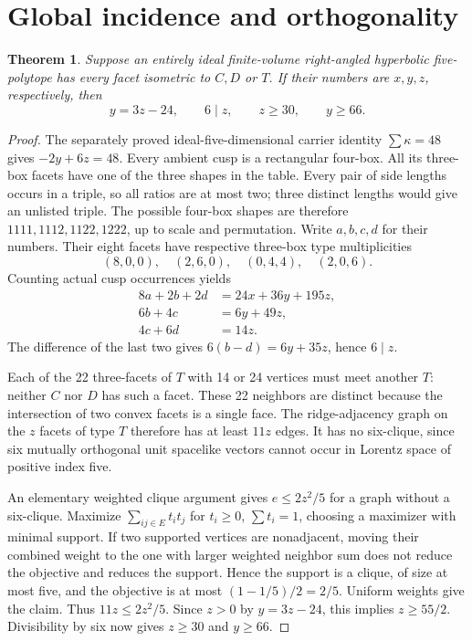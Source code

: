 \documentclass[11pt]{article}
\newtheorem{theorem}{Theorem}
\begin{document}
\section{Global incidence and orthogonality}
\begin{theorem}
Suppose an entirely ideal finite-volume right-angled hyperbolic
five-polytope has every facet isometric to $C,D$ or $T$. If their
numbers are $x,y,z$, respectively, then
\[
 y=3z-24,\qquad 6\mid z,\qquad z\ge30,\qquad y\ge66.
\]
\end{theorem}
\begin{proof}
The separately proved ideal-five-dimensional carrier identity
$\sum\kappa=48$ gives $-2y+6z=48$.
Every ambient cusp is a rectangular four-box. All its three-box facets
have one of the three shapes in the table. Every pair of side lengths
occurs in a triple, so all ratios are at most two; three distinct lengths
would give an unlisted triple. The possible four-box shapes are therefore
$1111,1112,1122,1222$, up to scale and permutation.
Write $a,b,c,d$ for their numbers. Their eight facets have respective
three-box type multiplicities
\[
 (8,0,0),\quad(2,6,0),\quad(0,4,4),\quad(2,0,6).
\]
Counting actual cusp occurrences yields
\begin{align*}
8a+2b+2d&=24x+36y+195z,\\
6b+4c&=6y+49z,\\
4c+6d&=14z.
\end{align*}
The difference of the last two gives $6(b-d)=6y+35z$, hence $6\mid z$.

Each of the 22 three-facets of $T$ with 14 or 24 vertices must meet
another $T$: neither $C$ nor $D$ has such a facet. These 22 neighbors
are distinct because the intersection of two convex facets is a single
face. The ridge-adjacency graph on the $z$ facets of type $T$ therefore
has at least $11z$ edges. It has no six-clique, since six mutually
orthogonal unit spacelike vectors cannot occur in Lorentz space of
positive index five.

An elementary weighted clique argument gives $e\le2z^2/5$ for a graph
without a six-clique. Maximize $\sum_{ij\in E}t_it_j$ for $t_i\ge0$,
$\sum t_i=1$, choosing a maximizer with minimal support. If two supported
vertices are nonadjacent, moving their combined weight to the one with
larger weighted neighbor sum does not reduce the objective and reduces
the support. Hence the support is a clique, of size at most five, and
the objective is at most $(1-1/5)/2=2/5$. Uniform weights give the claim.
Thus $11z\le2z^2/5$. Since $z>0$ by $y=3z-24$, this implies
$z\ge55/2$. Divisibility by six now gives $z\ge30$ and $y\ge66$.
\end{proof}
\end{document}
